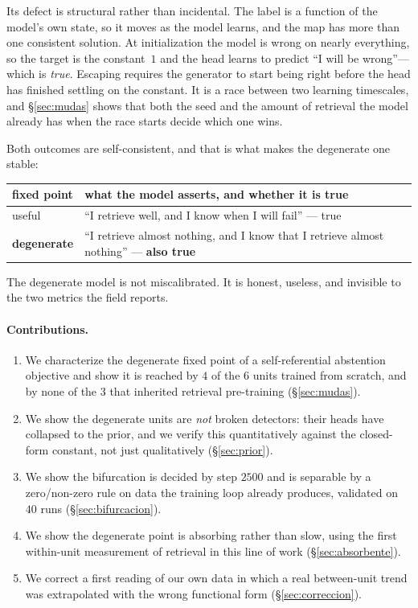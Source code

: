 \documentclass[11pt]{article}
\begin{document}
Its defect is structural rather than incidental. The label is a function of the model's own state, so
it moves as the model learns, and the map has more than one consistent solution. At initialization
the model is wrong on nearly everything, so the target is the constant~$1$ and the head learns to
predict ``I will be wrong''---which is \emph{true}. Escaping requires the generator to start being
right before the head has finished settling on the constant. It is a race between two learning
timescales, and \S\ref{sec:mudas} shows that both the seed and the amount of retrieval the model
already has when the race starts decide which one wins.

Both outcomes are self-consistent, and that is what makes the degenerate one stable:

\begin{center}
\begin{tabular}{ll}
\toprule
fixed point & what the model asserts, and whether it is true \\
\midrule
useful & ``I retrieve well, and I know when I will fail'' --- true \\
\textbf{degenerate} & ``I retrieve almost nothing, and I know that I retrieve almost nothing'' --- \textbf{also true} \\
\bottomrule
\end{tabular}
\end{center}

The degenerate model is not miscalibrated. It is honest, useless, and invisible to the two metrics
the field reports.

\paragraph{Contributions.}
\begin{enumerate}
\item We characterize the degenerate fixed point of a self-referential abstention objective and show
it is reached by $4$ of the $6$ units trained from scratch, and by none of the $3$ that inherited
retrieval pre-training (\S\ref{sec:mudas}).
\item We show the degenerate units are \emph{not} broken detectors: their heads have collapsed to the
prior, and we verify this quantitatively against the closed-form constant, not just qualitatively
(\S\ref{sec:prior}).
\item We show the bifurcation is decided by step $2500$ and is separable by a zero/non-zero rule on
data the training loop already produces, validated on $40$ runs (\S\ref{sec:bifurcacion}).
\item We show the degenerate point is absorbing rather than slow, using the first within-unit
measurement of retrieval in this line of work (\S\ref{sec:absorbente}).
\item We correct a first reading of our own data in which a real between-unit trend was extrapolated
with the wrong functional form (\S\ref{sec:correccion}).
\end{enumerate}
\end{document}
